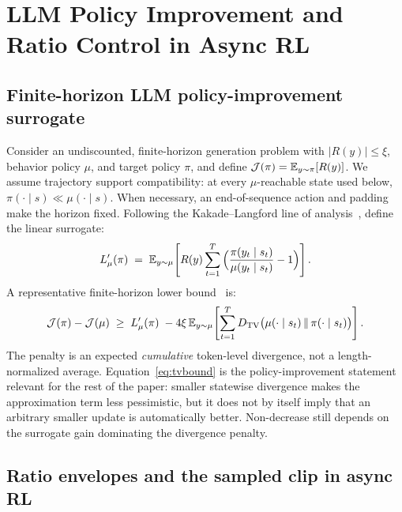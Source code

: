 \section{LLM Policy Improvement and Ratio Control in Async RL}
\label{sec:ppo-soft}

\subsection{Finite-horizon LLM policy-improvement surrogate}
\label{sec:llm-pi}

Consider an undiscounted, finite-horizon generation problem with $|R(y)|\le\xi$, behavior policy $\mu$, and target policy $\pi$, and define $\mathcal{J}(\pi)=\mathbb{E}_{y\sim\pi}[R(y)]$. We assume trajectory support compatibility: at every $\mu$-reachable state used below, $\pi(\cdot\mid s)\ll\mu(\cdot\mid s)$. When necessary, an end-of-sequence action and padding make the horizon fixed. Following the Kakade--Langford line of analysis~\citep{kakade2002approximately,schulman2015trpo}, define the linear surrogate:
\begin{equation}
L'_{\mu}(\pi)\;=\;\mathbb{E}_{y\sim\mu}\!\left[R(y)\sum_{t=1}^{T}\Big(\frac{\pi(y_t\mid s_t)}{\mu(y_t\mid s_t)}-1\Big)\right].
\label{eq:surrogate}
\end{equation}
A representative finite-horizon lower bound~\citep{qi2026dppo} is:
\begin{equation}
\mathcal{J}(\pi)-\mathcal{J}(\mu)\;\geq\;L'_{\mu}(\pi)\;-
4\xi\,\mathbb{E}_{y\sim\mu}\!\left[\sum_{t=1}^{T}D_{\mathrm{TV}}\big(\mu(\cdot\mid s_t)\,\|\,\pi(\cdot\mid s_t)\big)\right].
\label{eq:tvbound}
\end{equation}
The penalty is an expected \emph{cumulative} token-level divergence, not a length-normalized average. Equation~\eqref{eq:tvbound} is the policy-improvement statement relevant for the rest of the paper: smaller statewise divergence makes the approximation term less pessimistic, but it does not by itself imply that an arbitrary smaller update is automatically better. Non-decrease still depends on the surrogate gain dominating the divergence penalty.


\subsection{Ratio envelopes and the sampled clip in async RL}
\label{sec:ratio-envelope}

